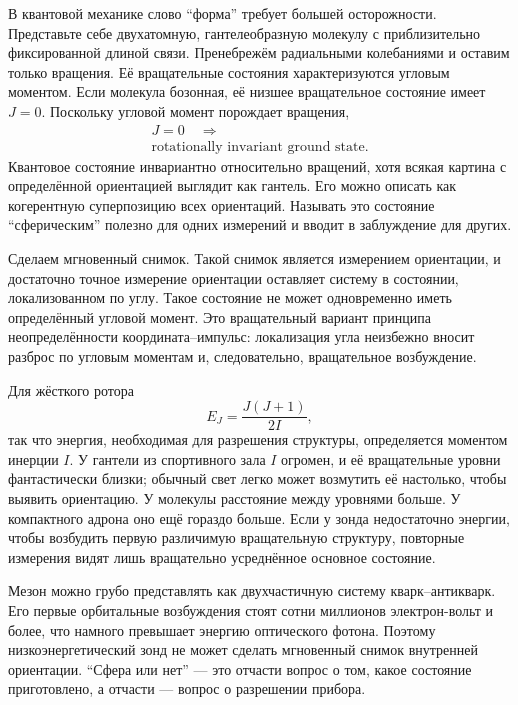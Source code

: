 В квантовой механике слово ``форма'' требует большей осторожности. Представьте себе двухатомную, гантелеобразную молекулу с приблизительно фиксированной длиной связи. Пренебрежём радиальными колебаниями и оставим только вращения. Её вращательные состояния характеризуются угловым моментом. Если молекула бозонная, её низшее вращательное состояние имеет \(J=0\). Поскольку угловой момент порождает вращения,
\begin{equation}
\begin{gathered}
J=0 \quad\Longrightarrow\\
\text{rotationally invariant ground state.}
\end{gathered}
\end{equation}
Квантовое состояние инвариантно относительно вращений, хотя всякая картина с определённой ориентацией выглядит как гантель. Его можно описать как когерентную суперпозицию всех ориентаций. Называть это состояние ``сферическим'' полезно для одних измерений и вводит в заблуждение для других.

Сделаем мгновенный снимок. Такой снимок является измерением ориентации, и достаточно точное измерение ориентации оставляет систему в состоянии, локализованном по углу. Такое состояние не может одновременно иметь определённый угловой момент. Это вращательный вариант принципа неопределённости координата--импульс: локализация угла неизбежно вносит разброс по угловым моментам и, следовательно, вращательное возбуждение.

Для жёсткого ротора
\begin{equation}
E_J=\frac{J(J+1)}{2I},
\end{equation}
так что энергия, необходимая для разрешения структуры, определяется моментом инерции \(I\). У гантели из спортивного зала \(I\) огромен, и её вращательные уровни фантастически близки; обычный свет легко может возмутить её настолько, чтобы выявить ориентацию. У молекулы расстояние между уровнями больше. У компактного адрона оно ещё гораздо больше. Если у зонда недостаточно энергии, чтобы возбудить первую различимую вращательную структуру, повторные измерения видят лишь вращательно усреднённое основное состояние.

Мезон можно грубо представлять как двухчастичную систему кварк--антикварк. Его первые орбитальные возбуждения стоят сотни миллионов электрон-вольт и более, что намного превышает энергию оптического фотона. Поэтому низкоэнергетический зонд не может сделать мгновенный снимок внутренней ориентации. ``Сфера или нет'' — это отчасти вопрос о том, какое состояние приготовлено, а отчасти — вопрос о разрешении прибора.

